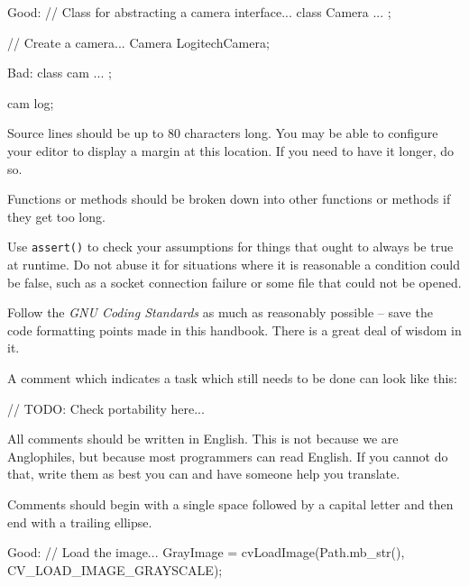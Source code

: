 Good:
\startCodeExample
// Class for abstracting a camera interface...
class Camera
{
    ...
};

// Create a camera...
Camera LogitechCamera;
\stopCodeExample

Bad:
\startCodeExample
class cam
{
    ...
};

cam log;
\stopCodeExample

\stopitemize


\startitemize[4]
\item
Source lines should be up to 80 characters long. You may be able to configure your editor to display a margin at this location. If you need to have it longer, do so.

\item
Functions or methods should be broken down into other functions or methods if they get too long.

\item
Use {\tt assert()} to check your assumptions for things that ought to always be true at runtime. Do not abuse it for situations where it is reasonable a condition could be false, such as a socket connection failure or some file that could not be opened.

\item
Follow the {\it GNU Coding Standards} as much as reasonably possible -- save the code formatting points made in this handbook. There is a great deal of wisdom in it.

\item
A comment which indicates a task which still needs to be done can look like this: 

\startCodeExample
// TODO: Check portability here...
\stopCodeExample

\stopitemize


\startitemize[4]
\item
All comments should be written in English. This is not because we are Anglophiles, but because most programmers can read English. If you cannot do that, write them as best you can and have someone help you translate.

\item
Comments should begin with a single space followed by a capital letter and then end with a trailing ellipse.

Good:
\startCodeExample
// Load the image...
GrayImage = cvLoadImage(Path.mb_str(), CV_LOAD_IMAGE_GRAYSCALE);
\stopCodeExample

